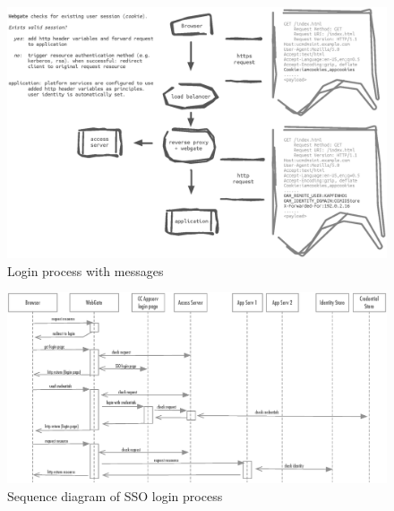 \documentclass[11pt]{report}
\begin{document}
\begin{figure}
    \centering
    \includegraphics[width=1\textwidth]{diag/msgdiag}
    \caption{Login process with messages}
\end{figure}


\begin{figure}
    \centering
    \includegraphics[width=1\textwidth]{diag/seqdiag}
    \caption{Sequence diagram of SSO login process}
\end{figure}




\end{document}

